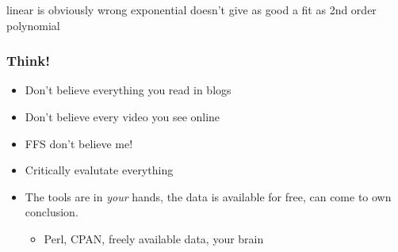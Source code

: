 \documentclass[notes]{beamer}
\begin{document}
\begin{frame}
linear is obviously wrong
exponential doesn't give as good a fit as 2nd order polynomial
\end{frame}

\begin{frame}
    \frametitle{Think!}
    \begin{itemize}
	\item Don't believe everything you read in blogs
	\item Don't believe every video you see online
	\item FFS don't believe me!
	\item Critically evalutate everything
	\item The tools are in \emph{your} hands, the data is available for
	    free, can come to own conclusion.
	    \begin{itemize}
		\item Perl, CPAN, freely available data, your brain
	    \end{itemize}
    \end{itemize}
\end{frame}






\end{document}
